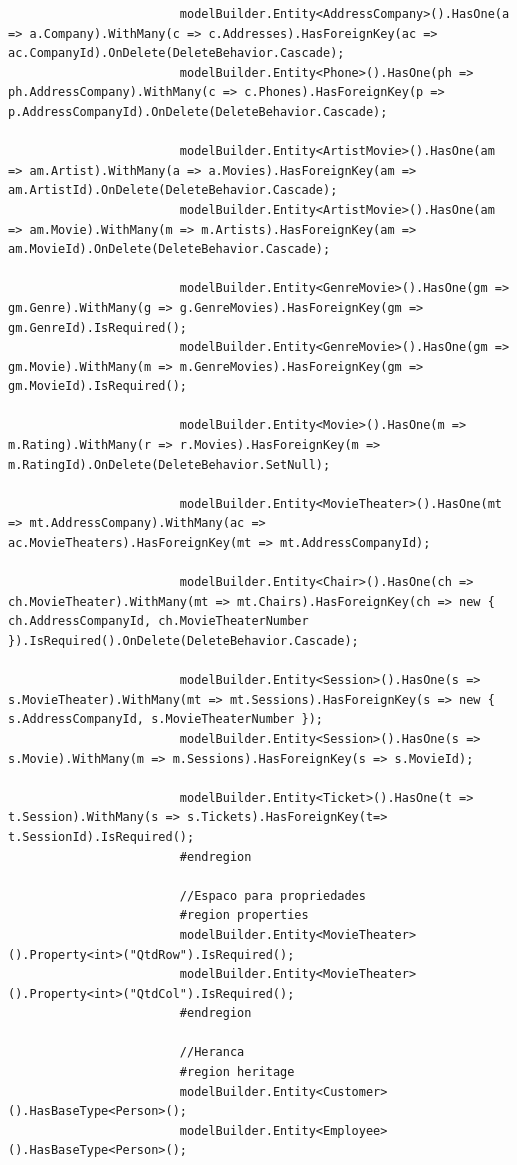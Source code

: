 \documentclass[a4paper,10pt]{article}
\begin{document}
\begin{lstlisting}
						modelBuilder.Entity<AddressCompany>().HasOne(a => a.Company).WithMany(c => c.Addresses).HasForeignKey(ac => ac.CompanyId).OnDelete(DeleteBehavior.Cascade);
						modelBuilder.Entity<Phone>().HasOne(ph => ph.AddressCompany).WithMany(c => c.Phones).HasForeignKey(p => p.AddressCompanyId).OnDelete(DeleteBehavior.Cascade);

						modelBuilder.Entity<ArtistMovie>().HasOne(am => am.Artist).WithMany(a => a.Movies).HasForeignKey(am => am.ArtistId).OnDelete(DeleteBehavior.Cascade);
						modelBuilder.Entity<ArtistMovie>().HasOne(am => am.Movie).WithMany(m => m.Artists).HasForeignKey(am => am.MovieId).OnDelete(DeleteBehavior.Cascade);

						modelBuilder.Entity<GenreMovie>().HasOne(gm => gm.Genre).WithMany(g => g.GenreMovies).HasForeignKey(gm => gm.GenreId).IsRequired();
						modelBuilder.Entity<GenreMovie>().HasOne(gm => gm.Movie).WithMany(m => m.GenreMovies).HasForeignKey(gm => gm.MovieId).IsRequired();

						modelBuilder.Entity<Movie>().HasOne(m => m.Rating).WithMany(r => r.Movies).HasForeignKey(m => m.RatingId).OnDelete(DeleteBehavior.SetNull);

						modelBuilder.Entity<MovieTheater>().HasOne(mt => mt.AddressCompany).WithMany(ac => ac.MovieTheaters).HasForeignKey(mt => mt.AddressCompanyId);

						modelBuilder.Entity<Chair>().HasOne(ch => ch.MovieTheater).WithMany(mt => mt.Chairs).HasForeignKey(ch => new { ch.AddressCompanyId, ch.MovieTheaterNumber }).IsRequired().OnDelete(DeleteBehavior.Cascade);

						modelBuilder.Entity<Session>().HasOne(s => s.MovieTheater).WithMany(mt => mt.Sessions).HasForeignKey(s => new { s.AddressCompanyId, s.MovieTheaterNumber });
						modelBuilder.Entity<Session>().HasOne(s => s.Movie).WithMany(m => m.Sessions).HasForeignKey(s => s.MovieId);

						modelBuilder.Entity<Ticket>().HasOne(t => t.Session).WithMany(s => s.Tickets).HasForeignKey(t=> t.SessionId).IsRequired();
						#endregion

						//Espaco para propriedades
						#region properties
						modelBuilder.Entity<MovieTheater>().Property<int>("QtdRow").IsRequired();
						modelBuilder.Entity<MovieTheater>().Property<int>("QtdCol").IsRequired();
						#endregion

						//Heranca
						#region heritage
						modelBuilder.Entity<Customer>().HasBaseType<Person>();
						modelBuilder.Entity<Employee>().HasBaseType<Person>();


\end{lstlisting}
\end{document}
